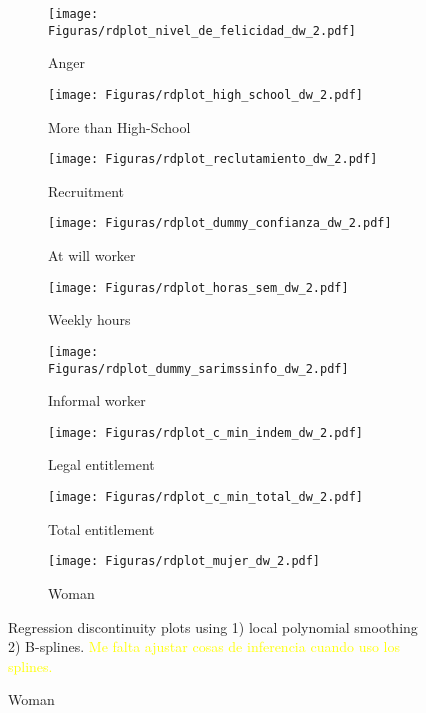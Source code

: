 \begin{figure}[H]
     \caption{RD plots (Calculator treatment; running variable : Daily wage)}
    \label{rd_covs_dw_t2}
\begin{center}
\begin{subfigure}{0.31\textwidth}
\caption{Anger}
        \texttt{[image: Figuras/rdplot\_nivel\_de\_felicidad\_dw\_2.pdf]}
    \end{subfigure}
    \begin{subfigure}{0.31\textwidth}
\caption{More than High-School}
        \texttt{[image: Figuras/rdplot\_high\_school\_dw\_2.pdf]}
    \end{subfigure}
\begin{subfigure}{0.31\textwidth}
\caption{Recruitment}
        \texttt{[image: Figuras/rdplot\_reclutamiento\_dw\_2.pdf]}
    \end{subfigure}
    \begin{subfigure}{0.31\textwidth}
\caption{At will worker}
        \texttt{[image: Figuras/rdplot\_dummy\_confianza\_dw\_2.pdf]}
    \end{subfigure}        
    \begin{subfigure}{0.31\textwidth}
\caption{Weekly hours}
        \texttt{[image: Figuras/rdplot\_horas\_sem\_dw\_2.pdf]}
    \end{subfigure}    
    \begin{subfigure}{0.31\textwidth}
\caption{Informal worker}
        \texttt{[image: Figuras/rdplot\_dummy\_sarimssinfo\_dw\_2.pdf]}
    \end{subfigure}       
\begin{subfigure}{0.31\textwidth}
\caption{Legal entitlement}
        \texttt{[image: Figuras/rdplot\_c\_min\_indem\_dw\_2.pdf]}
    \end{subfigure}
    \begin{subfigure}{0.31\textwidth}
\caption{Total entitlement}
        \texttt{[image: Figuras/rdplot\_c\_min\_total\_dw\_2.pdf]}
    \end{subfigure}        
\begin{subfigure}{0.31\textwidth}
\caption{Woman}
        \texttt{[image: Figuras/rdplot\_mujer\_dw\_2.pdf]}
    \end{subfigure}
  \end{center}
  
    \scriptsize Regression discontinuity plots using 1) local polynomial smoothing 2) B-splines. \textcolor{yellow}{Me falta ajustar cosas de inferencia cuando uso los splines.}
\end{figure}

